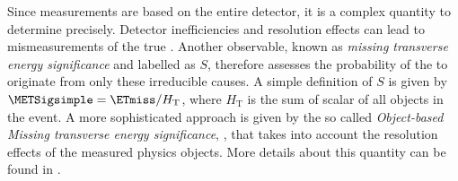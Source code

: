 Since \ETmiss measurements are based on the entire detector, it is a complex quantity to determine precisely. Detector inefficiencies and resolution effects can lead to mismeasurements of the true \ETmiss.
Another observable, known as \emph{missing transverse energy significance} and labelled as $S$, therefore assesses the probability of the \ETmiss to originate from only these irreducible causes.
A simple definition of $S$ is given by $\METSigsimple = \ETmiss / H_{\text{T}}$, where $H_{\text{T}}$ is the sum of scalar \pT of all objects in the event.
A more sophisticated approach is given by the so called \emph{Object-based Missing transverse energy significance}, \METSigobject, that takes into account the resolution effects of the measured physics objects.
More details about this quantity can be found in .





